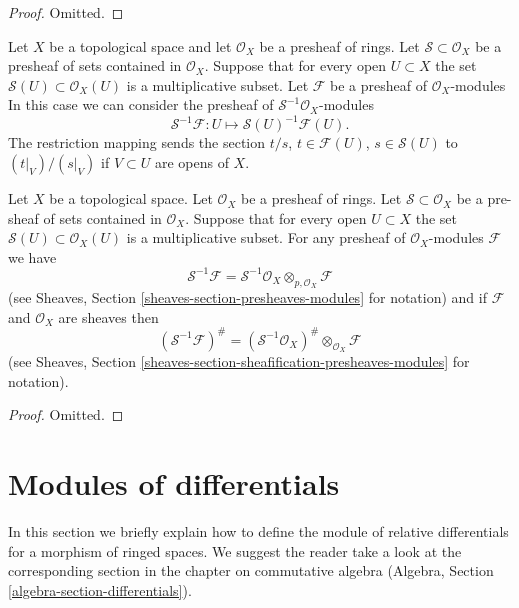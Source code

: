 \begin{proof}
Omitted.
\end{proof}

\noindent
Let $X$ be a topological space and let $\mathcal{O}_X$ be a
presheaf of rings. Let $\mathcal{S} \subset \mathcal{O}_X$
be a presheaf of sets contained in $\mathcal{O}_X$.
Suppose that for every open $U \subset X$ the set
$\mathcal{S}(U) \subset \mathcal{O}_X(U)$ is a multiplicative subset.
Let $\mathcal{F}$ be a presheaf of $\mathcal{O}_X$-modules
In this case we can consider the presheaf of
$\mathcal{S}^{-1}\mathcal{O}_X$-modules
$$
\mathcal{S}^{-1}\mathcal{F} :
U \longmapsto \mathcal{S}(U)^{-1}\mathcal{F}(U).
$$
The restriction mapping sends the section $t/s$, $t \in \mathcal{F}(U)$,
$s \in \mathcal{S}(U)$ to $(t|_V)/(s|_V)$ if $V \subset U$ are opens
of $X$.

\begin{lemma}
\label{lemma-simple-invert-module}
Let $X$ be a topological space.
Let $\mathcal{O}_X$ be a presheaf of rings.
Let $\mathcal{S} \subset \mathcal{O}_X$ be a pre-sheaf of sets contained
in $\mathcal{O}_X$. Suppose that for every open $U \subset X$ the set
$\mathcal{S}(U) \subset \mathcal{O}_X(U)$ is a multiplicative subset.
For any presheaf of $\mathcal{O}_X$-modules $\mathcal{F}$ we
have
$$
\mathcal{S}^{-1}\mathcal{F}
=
\mathcal{S}^{-1}\mathcal{O}_X \otimes_{p, \mathcal{O}_X} \mathcal{F}
$$
(see Sheaves, Section \ref{sheaves-section-presheaves-modules} for notation)
and if $\mathcal{F}$ and $\mathcal{O}_X$ are sheaves then
$$
(\mathcal{S}^{-1}\mathcal{F})^\#
=
(\mathcal{S}^{-1}\mathcal{O}_X)^\# \otimes_{\mathcal{O}_X} \mathcal{F}
$$
(see Sheaves, Section \ref{sheaves-section-sheafification-presheaves-modules}
for notation).
\end{lemma}

\begin{proof}
Omitted.
\end{proof}








\section{Modules of differentials}
\label{section-differentials}

\noindent
In this section we briefly explain how to define the module of relative
differentials for a morphism of ringed spaces. We suggest the reader take
a look at the corresponding section in the chapter on commutative algebra
(Algebra, Section \ref{algebra-section-differentials}).

